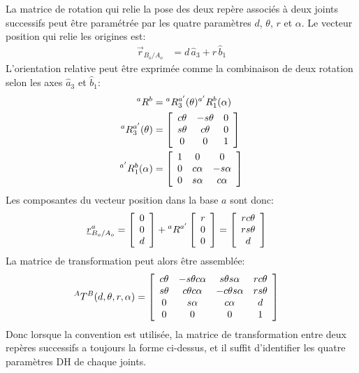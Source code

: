 La matrice de rotation qui relie la pose des deux repère associés à deux joints successifs peut être paramétrée par les quatre paramètres $d$, $\theta$, $r$ et $\alpha$. Le vecteur position qui relie les origines est:
\begin{align}
\vec{r}_{B_o/A_o} &=  d \, \hat{a}_3 + r \, \hat{b}_1
\end{align} 
L'orientation relative peut être exprimée comme la combinaison de deux rotation selon les axes $\hat{a}_3$ et $\hat{b}_1$:
\begin{align}
{}^aR^b &= {}^aR_3^{a'}(\theta) {}^{a'}R_1^b(\alpha) \\
{}^aR_3^{a'}(\theta)  &=
\left[ \begin{array}{c c c}
	c\theta & -s\theta & 0 \\
	s\theta & c\theta & 0 \\
	0 & 0 & 1 
\end{array}  \right]  \\
{}^{a'}R_1^b(\alpha)  &=
\left[ \begin{array}{c c c}
	1 & 0 & 0 \\
	0 & c\alpha & -s\alpha \\
	0 & s\alpha & c\alpha 
\end{array}  \right]  
\end{align} 
Les composantes du vecteur position dans la base $a$ sont donc:
\begin{align}
\underline{r}_{B_o/A_o}^a &=  
\left[ \begin{array}{c}
0 \\
0 \\
d
\end{array}  \right]  + {}^aR^{a'} \left[ \begin{array}{c}
r \\
0 \\
0
\end{array}  \right]  = \left[ \begin{array}{c}
r c\theta \\
r s\theta \\
d
\end{array}  \right] 
\end{align} 
La matrice de transformation peut alors être assemblée:
\begin{align}
{}^AT^{B}(d,\theta,r,\alpha) &=
\left[ \begin{array}{c c c c }
c\theta & -s\theta c\alpha & s\theta s\alpha & r c\theta\\
s\theta & c\theta c\alpha  & -c\theta s\alpha  & r s\theta\\
0 & s\alpha & c\alpha  &  d\\
0 & 0 & 0 & 1 
\end{array}  \right]  
\label{eq:Tdh}
\end{align} 
Donc lorsque la convention est utilisée, la matrice de transformation entre deux repères successifs a toujours la forme ci-dessus, et il suffit d'identifier les quatre paramètres DH de chaque joints. 

